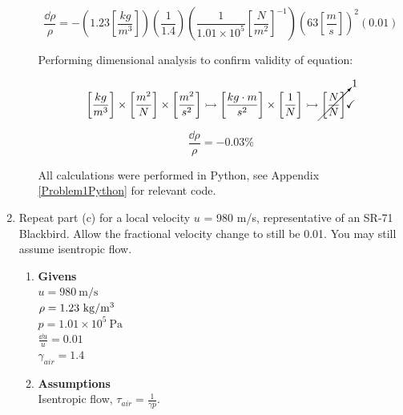 \documentclass[12pt,letterpaper]{article}
\begin{document}
\begin{enumerate}[label=(\alph*)]
\begin{enumerate}[label=\arabic*.]
			\begin{equation*}
				\frac{\dd \rho}{\rho} = - \left(1.23\left[\frac{kg}{m^3}\right]\right) \left(\frac{1}{1.4}\right)\left(\frac{1}{1.01 \times 10^5}\left[\frac{N}{m^2}\right]^{-1} \right) \left(63 \left[\frac{m}{s}\right]\right)^2 \left(0.01\right)
			\end{equation*}

			Performing dimensional analysis to confirm validity of equation:
			
			\begin{equation*}
				\left[\frac{kg}{m^3}\right] \times \left[\frac{m^2}{N}\right] \times \left[\frac{m^2}{s^2}\right] \rightarrowtail \left[\frac{kg \cdot m}{s^2}\right] \times \left[\frac{1}{N}\right] \rightarrowtail \cancelto{1}{\left[\frac{N}{N}\right]} \checkmark
			\end{equation*}

			\begin{equation*}
				\boxed{\frac{\dd \rho}{\rho} = -0.03\%}
			\end{equation*}
			
			All calculations were performed in Python, see Appendix \ref{Problem1Python} for relevant code. 


		\end{enumerate}

		\item Repeat part (c) for a local velocity $u$ = 980 m/s, representative of an SR-71 Blackbird. Allow the fractional velocity change to still be 0.01. You may still assume isentropic flow. 
		
		\begin{enumerate}[label=\arabic*.]
			
			\item{\textbf{Givens}} \\
			$u = 980 \ \textrm{m/s}$\\
			$\rho = 1.23 \ \mathrm{kg/m\textsuperscript{3}}$\\
			$p = 1.01 \times 10^5 \  \mathrm{Pa}$\\
			$\frac{\dd u}{u} = 0.01$\\
			$\gamma_{air} = 1.4$\\

			
			\item{\textbf{Assumptions}} \\
			Isentropic flow, $\tau_{air} = \frac{1}{\gamma p}$.



\end{enumerate}
\end{enumerate}
\end{document}
